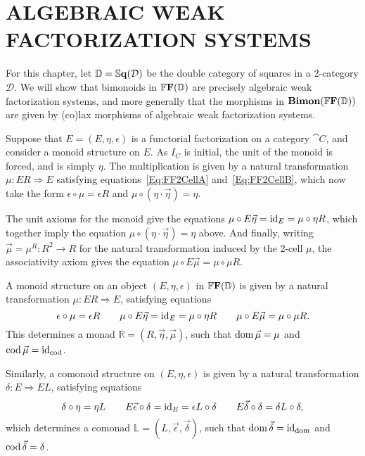 
\chapter{ALGEBRAIC WEAK FACTORIZATION SYSTEMS}\label{Ch:Awfs}

For this chapter, let $\mathbb{D}=\mathbb{S}\mathbf{q}(\mathcal{D})$ be the double category of squares in a 2-category $\mathcal{D}$. We will show that bimonoids in $\mathbb{F}\mathbf{F}(\mathbb{D})$ are precisely algebraic weak factorization systems, and more generally that the morphisms in $\mathbf{Bimon}(\mathbb{F}\mathbf{F}(\mathbb{D}))$ are given by (co)lax morphisms of algebraic weak factorization systems.

Suppose that $E=(E,\eta,\epsilon)$ is a functorial factorization on a category $\cat{C}$, and consider a monoid structure on $E$. As $I_C$ is initial, the unit of the monoid is forced, and is simply $\eta$. The multiplication is given by a natural transformation $\mu\colon ER\Rightarrow E$ satisfying equations~\eqref{Eq:FF2CellA} and~\eqref{Eq:FF2CellB}, which now take the form $\epsilon\circ\mu = \epsilon R$ and $\mu\circ(\eta\cdot\vec{\eta})=\eta$.

The unit axioms for the monoid give the equations $\mu\circ E\vec{\eta}=\operatorname{id}_E=\mu\circ\eta R$, which together imply the equation $\mu\circ(\eta\cdot\vec{\eta})=\eta$ above. And finally, writing $\vec{\mu}=\mu^R\colon R^2\to R$ for the natural transformation induced by the 2-cell $\mu$, the associativity axiom gives the equation $\mu\circ E\vec{\mu}=\mu\circ\mu R$.

\begin{proposition}
	A monoid structure on an object $(E,\eta,\epsilon)$ in $\mathbb{F}\mathbf{F}(\mathbb{D})$ is given by a natural transformation $\mu\colon ER\Rightarrow E$, satisfying equations
	\begin{equation}
		\epsilon\circ\mu=\epsilon R \qquad 
			\mu\circ E\vec{\eta}=\operatorname{id}_E=\mu\circ\eta R \qquad 
			\mu\circ E\vec{\mu}=\mu\circ\mu R.
	\end{equation}
	This determines a monad $\mathbb{R}=(R,\vec{\eta},\vec{\mu})$, such that $\operatorname{dom}\vec{\mu}=\mu$ and $\operatorname{cod}\vec{\mu}=\operatorname{id}_{\operatorname{cod}}$.

	Similarly, a comonoid structure on $(E,\eta,\epsilon)$ is given by a natural transformation $\delta\colon E\Rightarrow EL$, satisfying equations
	\begin{equation}
		\delta\circ\eta=\eta L \qquad 
			E\vec{\epsilon}\circ\delta=\operatorname{id}_E=\epsilon L\circ\delta \qquad
			E\vec{\delta}\circ\delta=\delta L\circ\delta,
	\end{equation}
	which determines a comonad $\mathbb{L}=(L,\vec{\epsilon},\vec{\delta})$, such that $\operatorname{dom}\vec{\delta}=\operatorname{id}_{\operatorname{dom}}$ and $\operatorname{cod}\vec{\delta}=\delta$.
\end{proposition}

